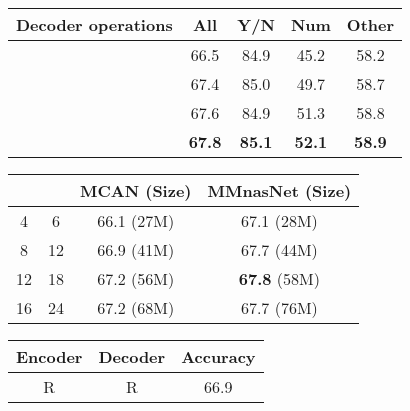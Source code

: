 \documentclass[sigconf]{acmart}
\begin{document}
\captionsetup[subtable]{font=footnotesize}
\begin{table*}
   \small
\begin{subtable}[t]{.36\textwidth}
		\centering
		\begin{tabular}{c|cccc}
            \toprule
            Decoder operations & All & Y/N& Num&Other\\
            \midrule
             & 66.5 & 84.9 & 45.2 & 58.2\\
            & 67.4 & 85.0 & 49.7 & 58.7\\
            & 67.6 & 84.9& 51.3 & 58.8\\
            & \textbf{67.8} & \textbf{85.1} &\textbf{52.1}& \textbf{58.9} \\
            \bottomrule
        \end{tabular}
        \vspace{5pt}
		\label{table:space}
	\end{subtable}
    \quad
    \quad
    \small
	    \begin{subtable}[t]{.3\textwidth}
		\centering
        \begin{tabular}{cc|cc}
            \toprule
             &  & MCAN (Size) & MMnasNet (Size)  \\
             \midrule
            4 & 6 & 66.1 (27M) &  67.1 (28M)\\
            8 & 12 & 66.9 (41M) &  67.7 (44M)\\
            12 &18 & 67.2 (56M)& \textbf{67.8} (58M) \\
            16 & 24 & 67.2 (68M) & 67.7 (76M) \\
            \bottomrule
        \end{tabular}
        \vspace{5pt}
    \label{table:depth}
	\end{subtable}
\quad
\quad
    \small
	\begin{subtable}[t]{.265\textwidth}
		\centering
        \begin{tabular}{cc|c}
            \toprule
            Encoder & Decoder & Accuracy \\
             \midrule
            R & R & 66.9 \\

\end{tabular}
\end{subtable}
\end{table*}
\end{document}
